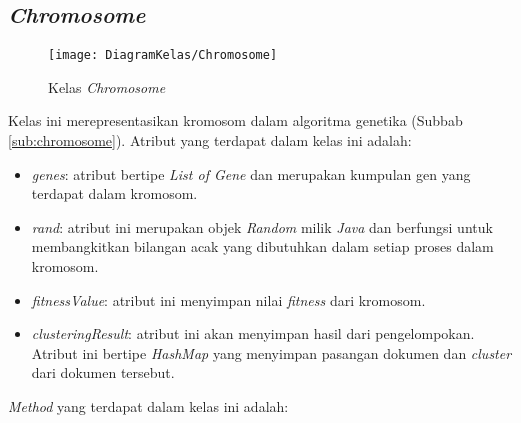\subsection{\textit{Chromosome}}

\begin{figure}[H]
	\begin{center}
		\texttt{[image: DiagramKelas/Chromosome]}
		\caption{Kelas \textit{Chromosome}}
		\label{fig:kelasChromosome}
	\end{center}
\end{figure}

Kelas ini merepresentasikan kromosom dalam algoritma genetika (Subbab \ref{sub:chromosome}). Atribut yang terdapat dalam kelas ini adalah:

\begin{itemize}
	\item \textit{genes}: atribut bertipe \textit{List of Gene} dan merupakan kumpulan gen yang terdapat dalam kromosom.
	\item \textit{rand}: atribut ini merupakan objek \textit{Random} milik \textit{Java} dan berfungsi untuk membangkitkan bilangan acak yang dibutuhkan dalam setiap proses dalam kromosom.
	\item \textit{fitnessValue}: atribut ini menyimpan nilai \textit{fitness} dari kromosom.
	\item \textit{clusteringResult}: atribut ini akan menyimpan hasil dari pengelompokan. Atribut ini bertipe \textit{HashMap} yang menyimpan pasangan dokumen dan \textit{cluster} dari dokumen tersebut.
\end{itemize}

\textit{Method} yang terdapat dalam kelas ini adalah:

